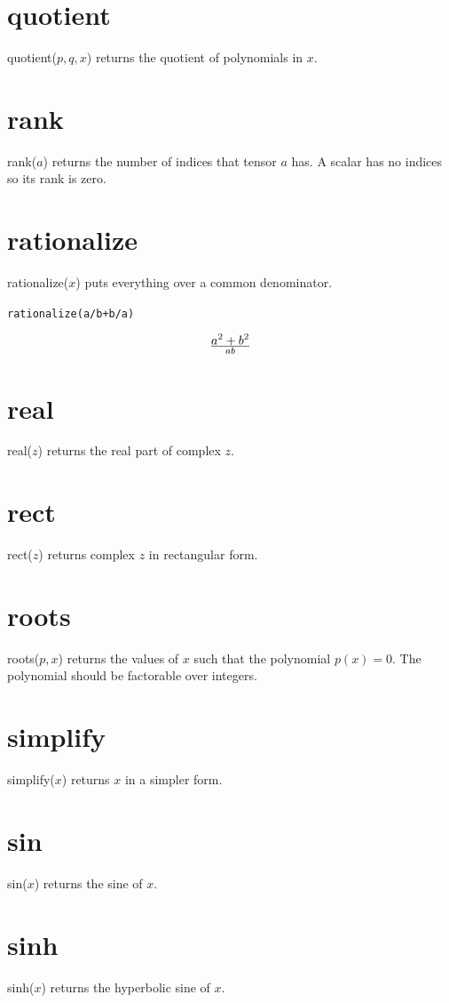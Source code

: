 \documentclass[12pt]{book}
\begin{document}
\section*{quotient}
quotient($p,q,x$) returns the quotient of polynomials in $x$.

\section*{rank}
rank($a$) returns the number of indices that tensor $a$ has.
A scalar has no indices so its rank is zero.

\section*{rationalize}
rationalize($x$) puts everything over a common denominator.

\medskip
{\tt rationalize(a/b+b/a)}

$$a^2+b^2\over ab$$

\section*{real}
real($z$) returns the real part of complex $z$.

\section*{rect}
rect($z$) returns complex $z$ in rectangular form.

\section*{roots}
roots($p,x$) returns the values of $x$ such that the polynomial $p(x)=0$.
The polynomial should be factorable over integers.

\section*{simplify}
simplify($x$) returns $x$ in a simpler form.

\section*{sin}
sin($x$) returns the sine of $x$.

\section*{sinh}
sinh($x$) returns the hyperbolic sine of $x$.
\end{document}
